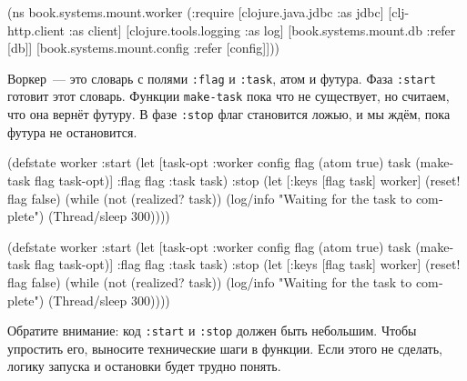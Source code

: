\else

\begin{english}
  \begin{clojure}
(ns book.systems.mount.worker
  (:require
   [clojure.java.jdbc :as jdbc]
   [clj-http.client :as client]
   [clojure.tools.logging :as log]
   [book.systems.mount.db :refer [db]]
   [book.systems.mount.config :refer [config]]))
  \end{clojure}
\end{english}

\fi

Воркер~--- это словарь с полями \verb|:flag| и \verb|:task|, атом и футура. Фаза
\verb|:start| готовит этот словарь. Функции \verb|make-task| пока что не
существует, но считаем, что она вернёт футуру. В фазе \verb|:stop| флаг
становится ложью, и мы ждём, пока футура не остановится.


\ifx\DEVICETYPE\MOBILE

\begin{english}
  \begin{clojure}
(defstate worker
  :start
  (let [{task-opt :worker} config
        flag (atom true)
        task (make-task flag task-opt)]
    {:flag flag :task task})
  :stop
  (let [{:keys [flag task]} worker]
    (reset! flag false)
    (while (not (realized? task))
      (log/info
      "Waiting for the task
                to complete")
      (Thread/sleep 300))))
  \end{clojure}
\end{english}

\else

\begin{english}
  \begin{clojure}
(defstate worker
  :start
  (let [{task-opt :worker} config
        flag (atom true)
        task (make-task flag task-opt)]
    {:flag flag :task task})
  :stop
  (let [{:keys [flag task]} worker]
    (reset! flag false)
    (while (not (realized? task))
      (log/info "Waiting for the task to complete")
      (Thread/sleep 300))))
  \end{clojure}
\end{english}

\fi

Обратите внимание: код \verb|:start| и \verb|:stop| должен быть небольшим. Чтобы
упростить его, выносите технические шаги в функции. Если этого не сделать,
логику запуска и остановки будет трудно понять.

